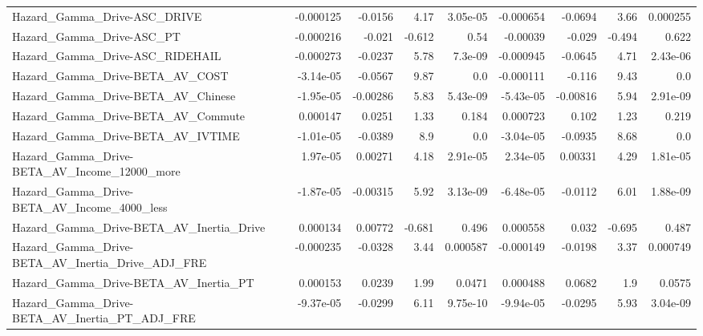 \begin{tabular}{lrrrrrrrr}
Hazard\_Gamma\_Drive-ASC\_DRIVE                       &   -0.000125 &      -0.0156 &     4.17 & 3.05e-05 &  -0.000654 &     -0.0694 &         3.66 &      0.000255 \\
Hazard\_Gamma\_Drive-ASC\_PT                          &   -0.000216 &       -0.021 &   -0.612 &     0.54 &   -0.00039 &      -0.029 &       -0.494 &         0.622 \\
Hazard\_Gamma\_Drive-ASC\_RIDEHAIL                    &   -0.000273 &      -0.0237 &     5.78 &  7.3e-09 &  -0.000945 &     -0.0645 &         4.71 &      2.43e-06 \\
Hazard\_Gamma\_Drive-BETA\_AV\_COST                    &   -3.14e-05 &      -0.0567 &     9.87 &      0.0 &  -0.000111 &      -0.116 &         9.43 &           0.0 \\
Hazard\_Gamma\_Drive-BETA\_AV\_Chinese                 &   -1.95e-05 &     -0.00286 &     5.83 & 5.43e-09 &  -5.43e-05 &    -0.00816 &         5.94 &      2.91e-09 \\
Hazard\_Gamma\_Drive-BETA\_AV\_Commute                 &    0.000147 &       0.0251 &     1.33 &    0.184 &   0.000723 &       0.102 &         1.23 &         0.219 \\
Hazard\_Gamma\_Drive-BETA\_AV\_IVTIME                  &   -1.01e-05 &      -0.0389 &      8.9 &      0.0 &  -3.04e-05 &     -0.0935 &         8.68 &           0.0 \\
Hazard\_Gamma\_Drive-BETA\_AV\_Income\_12000\_more       &    1.97e-05 &      0.00271 &     4.18 & 2.91e-05 &   2.34e-05 &     0.00331 &         4.29 &      1.81e-05 \\
Hazard\_Gamma\_Drive-BETA\_AV\_Income\_4000\_less        &   -1.87e-05 &     -0.00315 &     5.92 & 3.13e-09 &  -6.48e-05 &     -0.0112 &         6.01 &      1.88e-09 \\
Hazard\_Gamma\_Drive-BETA\_AV\_Inertia\_Drive           &    0.000134 &      0.00772 &   -0.681 &    0.496 &   0.000558 &       0.032 &       -0.695 &         0.487 \\
Hazard\_Gamma\_Drive-BETA\_AV\_Inertia\_Drive\_ADJ\_FRE   &   -0.000235 &      -0.0328 &     3.44 & 0.000587 &  -0.000149 &     -0.0198 &         3.37 &      0.000749 \\
Hazard\_Gamma\_Drive-BETA\_AV\_Inertia\_PT              &    0.000153 &       0.0239 &     1.99 &   0.0471 &   0.000488 &      0.0682 &          1.9 &        0.0575 \\
Hazard\_Gamma\_Drive-BETA\_AV\_Inertia\_PT\_ADJ\_FRE      &   -9.37e-05 &      -0.0299 &     6.11 & 9.75e-10 &  -9.94e-05 &     -0.0295 &         5.93 &      3.04e-09 \\

\end{tabular}
